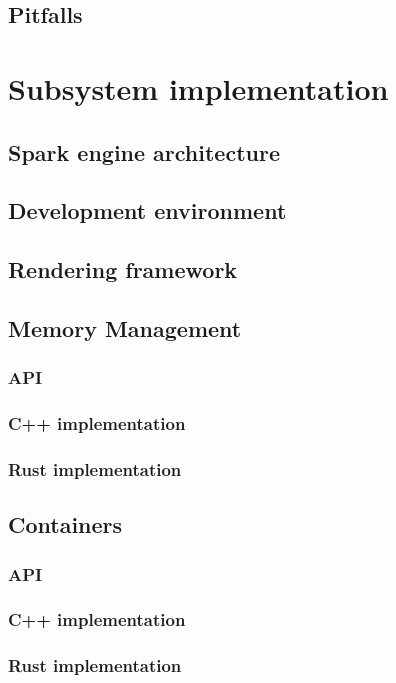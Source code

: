 \documentclass[MGS, Master, english]{twbook}
\begin{document}
\section{Pitfalls}
\blindtext
\chapter{Subsystem implementation}
\blindtext
\section{Spark engine architecture}
\blindtext
\section{Development environment}
\blindtext
\section{Rendering framework}
\blindtext
\section{Memory Management}
\blindtext
\subsection{API}
\blindtext
\subsection{C++ implementation}
\blindtext
\subsection{Rust implementation}
\blindtext
\section{Containers}
\blindtext
\subsection{API}
\blindtext
\subsection{C++ implementation}
\blindtext
\subsection{Rust implementation}
\blindtext
\end{document}
